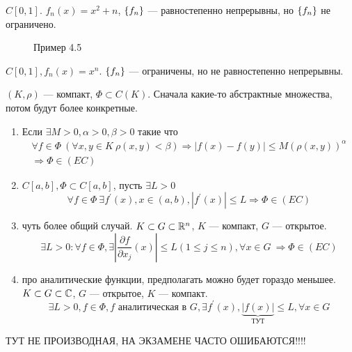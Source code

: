 \documentclass[document]{subfiles}
\begin{document}
\begin{example}
    $C[0,1]$. $f_n(x) = x^2 + n$, $\left\{f_n\right\}$ --- равностепенно непрерывны, но $\left\{f_n\right\}$ не ограничено.
    \begin{figure}
        \centering
        \caption{Пример 4.5}
    \end{figure}
    
\end{example}

\begin{example}
    $C[0,1], f_n(x) = x^n$. $\left\{f_n\right\}$ --- ограничены, но не равностепенно непрерывны.
\end{example}


\begin{theoremwobox}
    $(K, \rho)$ --- компакт, $\Phi \subset C(K)$.
    Сначала какие-то абстрактные множества, потом будут более конкретные.
    \begin{enumerate}
        \item Если $\exists M > 0, \alpha > 0, \beta > 0$ такие что 
        \begin{multline*}
            \forall f \in \Phi  \: (\forall x,y \in K  \: \rho(x,y) < \beta) \Rightarrow |f(x) - f(y)| \leq M(\rho(x,y))^\alpha \\
            \Rightarrow \Phi \in (EC)
        \end{multline*}
        \item $C[a,b], \Phi \subset C[a,b]$, пусть $\exists L > 0$ 
        \[ \forall f \in \Phi \: \exists f^\prime(x), x \in (a,b), |f^\prime(x)| \leq L \Rightarrow \Phi \in (EC) \]
        \item чуть более общий случай. $K \subset G \subset \mathbb{R}^n$, $K$ --- компакт, $G$ --- открытое.
        \[ \exists L > 0 : \forall f \in \Phi, \exists \left| \frac{\partial f}{\partial x_j}  (x) \right| \leq L (1 \leq j \leq n), \forall x \in G \:  \Rightarrow \Phi \in (EC)  \] 
        \item про аналитические функции, предполагать можно будет гораздо меньшее. 
        $K \subset G \subset \mathbb{C}$, $G$ --- открытое, $K$ --- компакт. 
        \[ \exists L > 0, f \in \Phi, f \text{ аналитическая в } G, \exists f^\prime(x), \underbrace{|f(x)|}_{\text{ТУТ}} \leq L, \forall x \in G \] 
    \end{enumerate}
        ТУТ НЕ ПРОИЗВОДНАЯ, НА ЭКЗАМЕНЕ ЧАСТО ОШИБАЮТСЯ!!!!
\end{theoremwobox}
\end{document}
